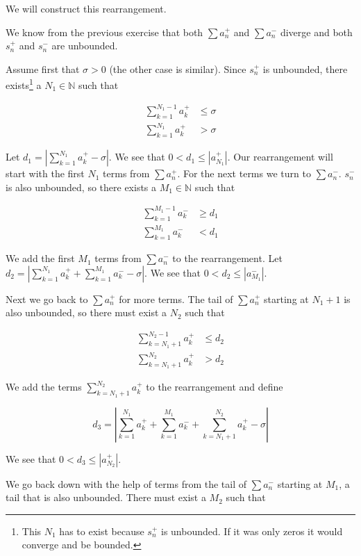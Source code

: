 \begin{solution}
We will construct this rearrangement.

We know from the previous exercise that both $\sum a^+_n$ and $\sum a^-_n$ diverge and both $s^+_n$ and $s^-_n$ are unbounded. 

Assume first that $\sigma > 0$ (the other case is similar). Since $s^+_n$ is unbounded, there exists\footnote{This $N_1$ has to exist because $s^+_n$ is unbounded. If it was only zeros it would converge and be bounded.} a $N_1 \in \mathbb{N}$ such that 

\begin{align*}
\sum_{k = 1}^{N_1-1} a^+_k  &\leq \sigma \\
\sum_{k = 1}^{N_1} a^+_k &> \sigma
\end{align*}

Let $d_1 = |\sum_{k = 1}^{N_1} a^+_k - \sigma|$. We see that $0 < d_1 \leq |a^+_{N_1}|$. Our rearrangement will start with the first $N_1$ terms from $\sum a^+_n$. For the next terms we turn to $\sum a^-_n$. $s^-_n$ is also unbounded, so there exists a $M_1 \in \mathbb{N}$ such that

\begin{align*}
\sum_{k = 1}^{M_1-1} a^-_k &\geq d_1 \\
\sum_{k = 1}^{M_1} a^-_k &< d_1
\end{align*}

We add the first $M_1$ terms from $\sum a^-_n$ to the rearrangement. Let $d_2 = |\sum_{k = 1}^{N_1} a^+_k + \sum_{k = 1}^{M_1} a^-_k - \sigma|$. We see that $0 < d_2 \leq |a^-_{M_1}|$.

Next we go back to $\sum a^+_n$ for more terms. The tail of $\sum a^+_n$ starting at $N_1 + 1$ is also unbounded, so there must exist a $N_2$ such that

\begin{align*}
\sum_{k = N_1 + 1}^{N_2-1} a^+_k  &\leq d_2 \\
\sum_{k = N_1 + 1}^{N_2} a^+_k &> d_2
\end{align*}

We add the terms $\sum_{k = N_1 + 1}^{N_2} a^+_k$ to the rearrangement and define 

$$
d_3 = |\sum_{k = 1}^{N_1} a^+_k + \sum_{k = 1}^{M_1} a^-_k + \sum_{k = N_1 + 1}^{N_2} a^+_k - \sigma|
$$

We see that $0 < d_3 \leq |a^+_{N_2}|$.

We go back down with the help of terms from the tail of $\sum a^-_n$ starting at $M_1$, a tail that is also unbounded. There must exist a $M_2$ such that


\end{solution}
